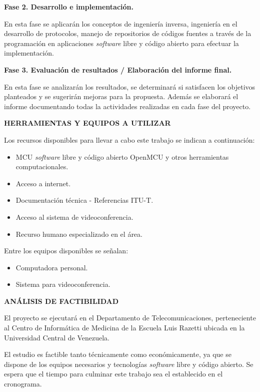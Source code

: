 \documentclass[12pt,letterpaper]{article}
\begin{document}
\textbf{Fase 2. Desarrollo e implementación.}

En esta fase se aplicarán los conceptos de ingeniería inversa, ingeniería en el desarrollo de protocolos, manejo de repositorios de códigos fuentes a través de la programación en aplicaciones \emph{software} libre y código abierto para efectuar la implementación.

\textbf{Fase 3. Evaluación de resultados / Elaboración del informe final.}  

En esta fase se analizarán los resultados, se determinará si satisfacen los objetivos planteados y se sugerirán mejoras para la propuesta. Además se elaborará el informe documentando todas la actividades realizadas en cada fase del proyecto.

\centerline{\textbf{HERRAMIENTAS Y EQUIPOS A UTILIZAR}}

Los recursos disponibles para llevar a cabo este trabajo se indican a continuación:
\begin{itemize} 
	\item MCU \emph{software} libre y código abierto OpenMCU y otros herramientas computacionales.
	\item Acceso a internet.
	\item Documentación técnica - Referencias ITU-T.
	\item Acceso al sistema de videoconferencia. 
	\item Recurso humano especializado en el área.
\end{itemize}

Entre los equipos disponibles se señalan: 
	\begin{itemize}
	\item Computadora personal.
	\item Sistema para videoconferencia.
	\end{itemize}

\centerline {\textbf{ANÁLISIS DE FACTIBILIDAD}}

El proyecto se ejecutará en el Departamento de Telecomunicaciones, perteneciente al Centro de Informática de Medicina de la Escuela Luis Razetti ubicada en la Universidad Central de Venezuela. 

El estudio es factible tanto técnicamente como económicamente, ya que se dispone de los equipos necesarios y tecnologías \emph{software} libre y código abierto. Se espera que el tiempo para culminar este trabajo sea el establecido en el cronograma. 

\renewcommand{\refname}{\centerline{\normalsize REFERENCIAS BIBLIOGRÁFICAS}}
\end{document}
